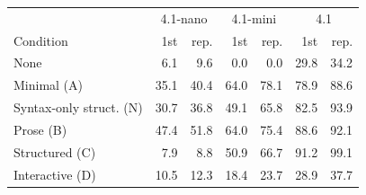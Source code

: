 \begin{tabular}{lrrrrrr}
\toprule
& \multicolumn{2}{c}{4.1-nano} & \multicolumn{2}{c}{4.1-mini} & \multicolumn{2}{c}{4.1} \\
Condition & 1st & rep. & 1st & rep. & 1st & rep. \\
\midrule
None & 6.1 & 9.6 & 0.0 & 0.0 & 29.8 & 34.2 \\
Minimal (A) & 35.1 & 40.4 & 64.0 & 78.1 & 78.9 & 88.6 \\
Syntax-only struct. (N) & 30.7 & 36.8 & 49.1 & 65.8 & 82.5 & 93.9 \\
Prose (B) & 47.4 & 51.8 & 64.0 & 75.4 & 88.6 & 92.1 \\
Structured (C) & 7.9 & 8.8 & 50.9 & 66.7 & 91.2 & 99.1 \\
Interactive (D) & 10.5 & 12.3 & 18.4 & 23.7 & 28.9 & 37.7 \\
\bottomrule
\end{tabular}